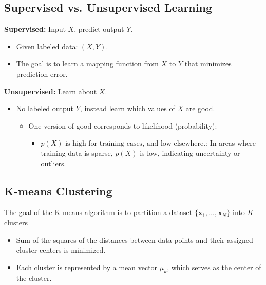 \subsection{Supervised vs. Unsupervised Learning}
\begin{intuition}

    \textbf{Supervised:} Input \( X \), predict output \( Y \).
    \begin{itemize}
        \item Given labeled data: \( (X, Y) \).
        \item The goal is to learn a mapping function from \( X \) to \( Y \) that minimizes prediction error.
    \end{itemize}

    \textbf{Unsupervised:} Learn about \( X \).
    \begin{itemize}
        \item No labeled output \( Y \), instead learn which values of \( X \) are good.
        \begin{itemize}
            \item One version of good corresponds to likelihood (probability): 
            \begin{itemize}
                \item $p(X) \text{ is high for training cases, and low elsewhere.}$: In areas where training data is sparse, \( p(X) \) is low, indicating uncertainty or outliers.
            \end{itemize}
        \end{itemize}
    \end{itemize}
\end{intuition}

\subsection{K-means Clustering}
\begin{definition}
    The goal of the K-means algorithm is to partition a dataset $\{\mathbf{x}_1,\ldots,\mathbf{x}_N\}$ into \( K \) clusters
    \begin{itemize}
        \item Sum of the squares of the distances between data points and their assigned cluster centers is minimized. 
        \item Each cluster is represented by a mean vector \( \mu_k \), which serves as the center of the cluster.
    \end{itemize}
\end{definition}

